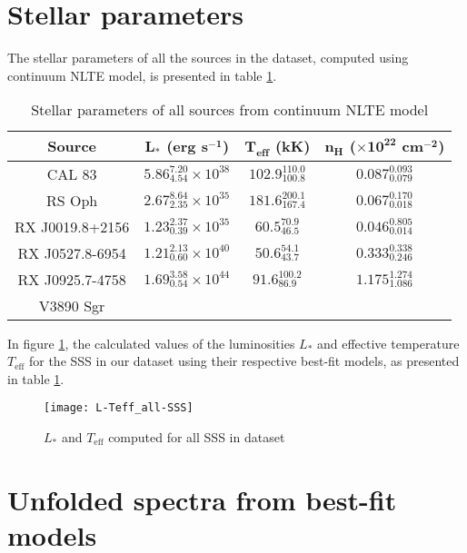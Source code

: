 	\section{Stellar parameters}
		The stellar parameters of all the sources in the dataset, computed using continuum NLTE model, is presented in table \ref{tab:sss-stellar-params}.
		\renewcommand{\arraystretch}{1.8}
		\begin{table}[!htb]
			\centering
			\caption{Stellar parameters of all sources from continuum NLTE model}
			\label{tab:sss-stellar-params}
			\begin{tabular}{cccc}
			\hline
			{\textbf{Source}} & {$\boldsymbol{L_*}$ \textbf{(erg s$\boldsymbol{^{-1}}$)}} & {\textbf{$\boldsymbol{T_\text{eff}}$ (kK)}} & {\textbf{$\boldsymbol{n_H}$ ($\boldsymbol{\times 10^{22}}$ cm$\boldsymbol{^{-2}}$)}} \\
			\hline
			{CAL 83} & {$5.86_{4.54}^{7.20}\times 10^{38}$} & {$102.9_{100.8}^{110.0}$} & {$0.087_{0.079}^{0.093}$} \\
			{RS Oph} & {$2.67_{2.35}^{8.64}\times 10^{35}$} & {$181.6_{167.4}^{200.1}$} & {$0.067_{0.018}^{0.170}$} \\
			{RX J0019.8+2156} & {$1.23_{0.39}^{2.37}\times 10^{35}$} & {$60.5_{46.5}^{70.9}$} & {$0.046_{0.014}^{0.805}$} \\
			{RX J0527.8-6954} & {$1.21_{0.60}^{2.13}\times 10^{40}$} & {$50.6_{43.7}^{54.1}$} & {$0.333_{0.246}^{0.338}$} \\
			{RX J0925.7-4758} & {$1.69_{0.54}^{3.58}\times 10^{44}$} & {$91.6_{86.9}^{100.2}$} & {$1.175_{1.086}^{1.274}$} \\
			{V3890 Sgr} & {} & {} & {} \\
			\hline
			\end{tabular}
		\end{table}
		\renewcommand{\arraystretch}{2.2}
		
		In figure \ref{result:L-Teff-SSS}, the calculated values of the luminosities $L_*$ and effective temperature $T_\text{eff}$ for the SSS in our dataset using their respective best-fit models, as presented in table \ref{tab:sss-stellar-params}.
		\begin{figure}[h!]
			\centering
			\texttt{[image: L-Teff\_all-SSS]}
			\caption{$L_*$ and $T_\text{eff}$ computed for all SSS in dataset}
			\label{result:L-Teff-SSS}
		\end{figure}
	
	\section{Unfolded spectra from best-fit models}
	
